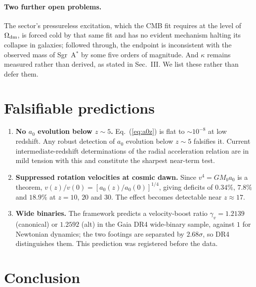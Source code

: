 \documentclass[aps,prd,twocolumn,superscriptaddress,nofootinbib,floatfix]{revtex4-2}
\newcommand{\azero}{a_{0}}
\begin{document}
\paragraph*{Two further open problems.} The sector's pressureless excitation, which the CMB fit
requires at the level of $\Omega_{\rm dm}$, is forced cold by that same fit and has no evident
mechanism halting its collapse in galaxies; followed through, the endpoint is inconsistent with
the observed mass of Sgr~A$^{*}$ by some five orders of magnitude. And $\kappa$ remains measured
rather than derived, as stated in Sec.~III. We list these rather than defer them.

\section{Falsifiable predictions}

\begin{enumerate}\itemsep2pt
\item \textbf{No $\azero$ evolution below $z \sim 5$.} Eq.~(\ref{eq:a0z}) is flat to
      $\sim10^{-8}$ at low redshift. Any robust detection of $\azero$ evolution below $z\sim5$
      falsifies it. Current intermediate-redshift determinations of the radial acceleration
      relation are in mild tension with this and constitute the sharpest near-term test.
\item \textbf{Suppressed rotation velocities at cosmic dawn.} Since $v^{4} = GM_{b}\azero$ is a
      theorem, $v(z)/v(0) = [\azero(z)/\azero(0)]^{1/4}$, giving deficits of $0.34\%$, $7.8\%$
      and $18.9\%$ at $z = 10$, $20$ and $30$. The effect becomes detectable near $z \approx 17$.
\item \textbf{Wide binaries.} The framework predicts a velocity-boost ratio $\gamma_{v} =
      1.2139$ (canonical) or $1.2592$ (alt) in the Gaia DR4 wide-binary sample, against $1$ for
      Newtonian dynamics; the two footings are separated by $2.68\sigma$, so DR4 distinguishes
      them. This prediction was registered before the data.
\end{enumerate}

\section{Conclusion}
\end{document}
